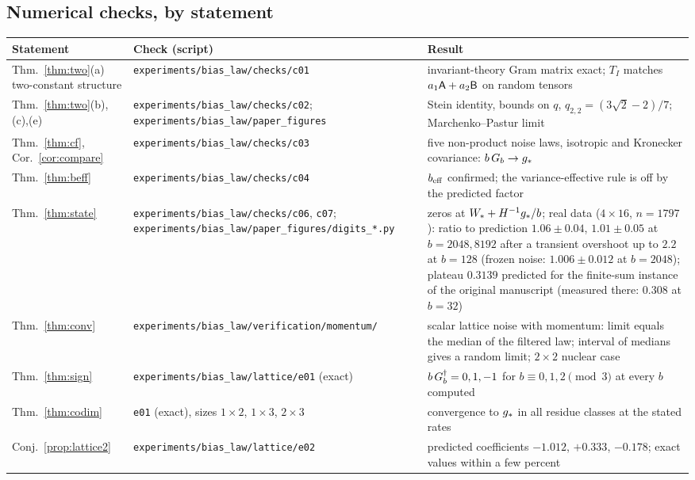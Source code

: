 \subsection{Numerical checks, by statement}
{\small
\begin{longtable}{@{}p{}p{}p{}@{}}
\toprule
Statement & Check (script) & Result\\
\midrule
\endhead
Thm.~\ref{thm:two}(a) two-constant structure & \texttt{experiments/bias\_law/checks/c01} & invariant-theory Gram matrix exact; $T_I$ matches $a_1\mathsf{A}+a_2\mathsf{B}$ on random tensors\\
Thm.~\ref{thm:two}(b),(c),(e) & \texttt{experiments/bias\_law/checks/c02}; \texttt{experiments/bias\_law/paper\_figures} & Stein identity, bounds on $q$, $q_{2,2}=(3\sqrt2-2)/7$; Marchenko--Pastur limit\\
Thm.~\ref{thm:cf}, Cor.~\ref{cor:compare} & \texttt{experiments/bias\_law/checks/c03} & five non-product noise laws, isotropic and Kronecker covariance: $b\,G_b\to g_\ast$\\
Thm.~\ref{thm:beff} & \texttt{experiments/bias\_law/checks/c04} & $b_{\mathrm{eff}}$ confirmed; the variance-effective rule is off by the predicted factor\\
Thm.~\ref{thm:state} & \texttt{experiments/bias\_law/checks/c06}, \texttt{c07}; \texttt{experiments/bias\_law/paper\_figures/digits\_*.py} & zeros at $W_\ast+H^{-1}g_\ast/b$; real data ($4\times16$, $n=1797$): ratio to prediction $1.06\pm0.04$, $1.01\pm0.05$ at $b=2048,8192$ after a transient overshoot up to $2.2$ at $b=128$ (frozen noise: $1.006\pm0.012$ at $b=2048$); plateau $0.3139$ predicted for the finite-sum instance of the original manuscript (measured there: $0.308$ at $b=32$)\\
Thm.~\ref{thm:conv} & \texttt{experiments/bias\_law/verification/momentum/} & scalar lattice noise with momentum: limit equals the median of the filtered law; interval of medians gives a random limit; $2\times2$ nuclear case\\
Thm.~\ref{thm:sign} & \texttt{experiments/bias\_law/lattice/e01} (exact) & $b\,G_b^\dagger=0,1,-1$ for $b\equiv0,1,2\pmod3$ at every $b$ computed\\
Thm.~\ref{thm:codim} & \texttt{e01} (exact), sizes $1\times2$, $1\times3$, $2\times3$ & convergence to $g_\ast$ in all residue classes at the stated rates\\
Conj.~\ref{prop:lattice2} & \texttt{experiments/bias\_law/lattice/e02} & predicted coefficients $-1.012$, $+0.333$, $-0.178$; exact values within a few percent\\

\end{longtable}}
